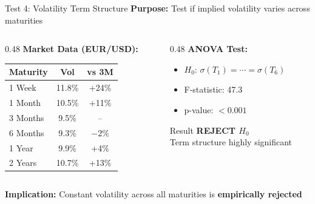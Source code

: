 \documentclass[11pt,aspectratio=169]{beamer}
\begin{document}
	\begin{frame}{Test 4: Volatility Term Structure}
		\textbf{Purpose:} Test if implied volatility varies across maturities
		
		\vspace{0.2cm}
		
		\begin{columns}[T]
			\begin{column}{0.48\textwidth}
				\textbf{Market Data (EUR/USD):}
				\scriptsize
				\begin{table}
					\begin{tabular}{|l|c|c|}
						\hline
						\textbf{Maturity} & \textbf{Vol} & \textbf{vs 3M} \\
						\hline
						1 Week & 11.8\% & +24\% \\
						1 Month & 10.5\% & +11\% \\
						3 Months & 9.5\% & -- \\
						6 Months & 9.3\% & $-2\%$ \\
						1 Year & 9.9\% & +4\% \\
						2 Years & 10.7\% & +13\% \\
						\hline
					\end{tabular}
				\end{table}
				\normalsize
			\end{column}
			
			\begin{column}{0.48\textwidth}
				\textbf{ANOVA Test:}
				\begin{itemize}
					\item $H_0$: $\sigma(T_1) = \cdots = \sigma(T_6)$
					\item F-statistic: 47.3
					\item p-value: $< 0.001$
				\end{itemize}
				
				\vspace{0.3cm}
				
				\begin{alertblock}{Result}
					\textcolor{mufgred}{\textbf{REJECT $H_0$}} \\
					Term structure highly significant
				\end{alertblock}
			\end{column}
		\end{columns}
		
		\vspace{0.3cm}
		
		\textbf{Implication:} Constant volatility across all maturities is \textbf{empirically rejected}
	\end{frame}
	
\end{document}
